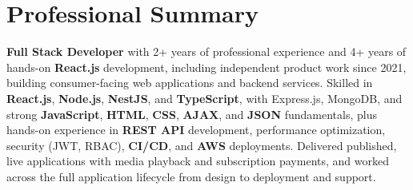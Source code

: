 \section{Professional Summary}
\vspace{2pt}

\textbf{Full Stack Developer} with 2+ years of professional experience and 4+ years of hands-on \textbf{React.js} development, including independent product work since 2021, building consumer-facing web applications and backend services. Skilled in \textbf{React.js}, \textbf{Node.js}, \textbf{NestJS}, and \textbf{TypeScript}, with Express.js, MongoDB, and strong \textbf{JavaScript}, \textbf{HTML}, \textbf{CSS}, \textbf{AJAX}, and \textbf{JSON} fundamentals, plus hands-on experience in \textbf{REST API} development, performance optimization, security (JWT, RBAC), \textbf{CI/CD}, and \textbf{AWS} deployments. Delivered published, live applications with media playback and subscription payments, and worked across the full application lifecycle from design to deployment and support.
